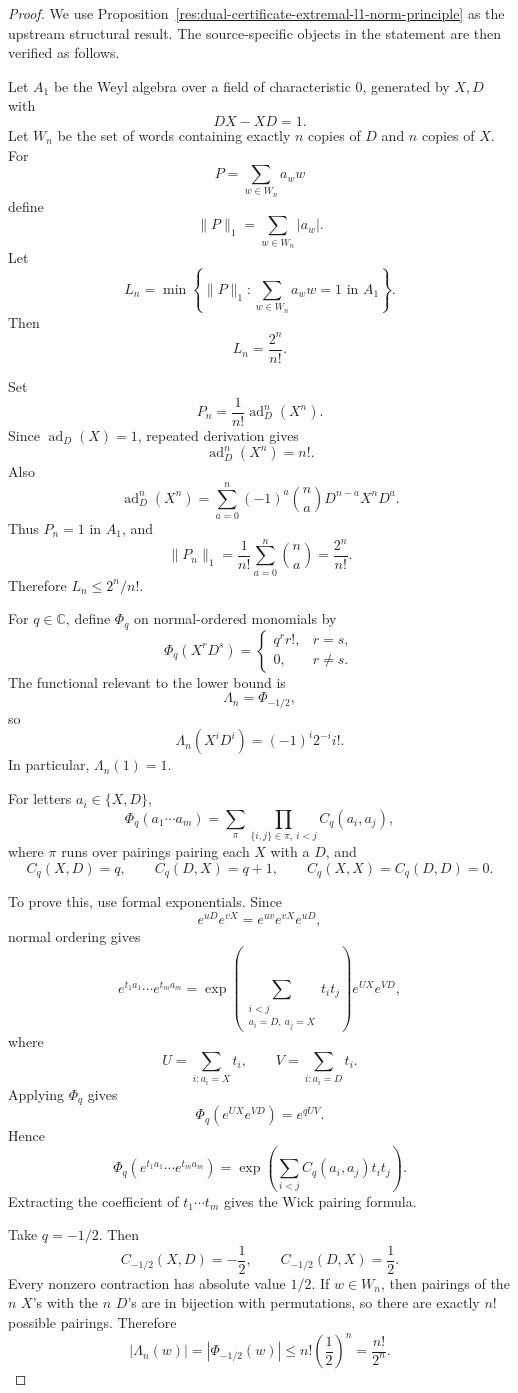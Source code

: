 \documentclass[11pt]{article}
\numberwithin{equation}{section}
\theoremstyle{definition}
\theoremstyle{remark}
\newcommand{\1}{\mathbf 1}
\begin{document}
\begin{proof}
We use Proposition~\ref{res:dual-certificate-extremal-l1-norm-principle} as the upstream structural result. The source-specific objects in the statement are then verified as follows.

Let \(A_1\) be the Weyl algebra over a field of characteristic \(0\), generated by \(X,D\) with
\[
DX-XD=1.
\]
Let \(W_n\) be the set of words containing exactly \(n\) copies of \(D\) and \(n\) copies of \(X\). For
\[
P=\sum_{w\in W_n}a_w w
\]
define
\[
\|P\|_1=\sum_{w\in W_n}|a_w|.
\]
Let
\[
L_n=\min\left\{\|P\|_1:\sum_{w\in W_n}a_w w=1\text{ in }A_1\right\}.
\]
Then
\[
L_n=\frac{2^n}{n!}.
\]

Set
\[
P_n=\frac1{n!}\operatorname{ad}_D^n(X^n).
\]
Since \(\operatorname{ad}_D(X)=1\), repeated derivation gives
\[
\operatorname{ad}_D^n(X^n)=n!.
\]
Also
\[
\operatorname{ad}_D^n(X^n)
=
\sum_{a=0}^n(-1)^a\binom naD^{n-a}X^nD^a.
\]
Thus \(P_n=1\) in \(A_1\), and
\[
\|P_n\|_1
=
\frac1{n!}\sum_{a=0}^n\binom na
=
\frac{2^n}{n!}.
\]
Therefore \(L_n\le2^n/n!\).

For \(q\in\mathbb C\), define \(\Phi_q\) on normal-ordered monomials by
\[
\Phi_q(X^rD^s)=
\begin{cases}
q^r r!,&r=s,\\
0,&r\ne s.
\end{cases}
\]
The functional relevant to the lower bound is
\[
\Lambda_n=\Phi_{-1/2},
\]
so
\[
\Lambda_n(X^iD^i)=(-1)^i2^{-i}i!.
\]
In particular, \(\Lambda_n(1)=1\).

For letters \(a_i\in\{X,D\}\),
\[
\Phi_q(a_1\cdots a_m)
=
\sum_\pi
\prod_{\{i,j\}\in\pi,\ i<j} C_q(a_i,a_j),
\]
where \(\pi\) runs over pairings pairing each \(X\) with a \(D\), and
\[
C_q(X,D)=q,\qquad
C_q(D,X)=q+1,\qquad
C_q(X,X)=C_q(D,D)=0.
\]

To prove this, use formal exponentials. Since
\[
e^{uD}e^{vX}=e^{uv}e^{vX}e^{uD},
\]
normal ordering gives
\[
e^{t_1a_1}\cdots e^{t_ma_m}
=
\exp\left(\sum_{\substack{i<j\\a_i=D,\ a_j=X}}t_it_j\right)
e^{UX}e^{VD},
\]
where
\[
U=\sum_{i:a_i=X}t_i,\qquad
V=\sum_{i:a_i=D}t_i.
\]
Applying \(\Phi_q\) gives
\[
\Phi_q(e^{UX}e^{VD})=e^{qUV}.
\]
Hence
\[
\Phi_q(e^{t_1a_1}\cdots e^{t_ma_m})
=
\exp\left(\sum_{i<j}C_q(a_i,a_j)t_it_j\right).
\]
Extracting the coefficient of \(t_1\cdots t_m\) gives the Wick pairing formula.

Take \(q=-1/2\). Then
\[
C_{-1/2}(X,D)=-\frac12,\qquad
C_{-1/2}(D,X)=\frac12.
\]
Every nonzero contraction has absolute value \(1/2\). If \(w\in W_n\), then pairings of the \(n\) \(X\)'s with the \(n\) \(D\)'s are in bijection with permutations, so there are exactly \(n!\) possible pairings. Therefore
\[
|\Lambda_n(w)|
=
|\Phi_{-1/2}(w)|
\le
n!\left(\frac12\right)^n
=
\frac{n!}{2^n}.
\]


\end{proof}
\end{document}
